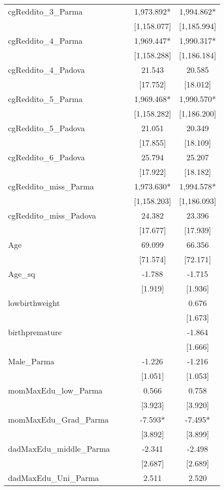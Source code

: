 \documentclass[]{article}
\begin{document}
\begin{tabular}{lcccc}
cgReddito\_3\_Parma &  &  & 1,973.892* & 1,994.862* \\
 &  &  & [1,158.077] & [1,185.994] \\
cgReddito\_4\_Parma &  &  & 1,969.447* & 1,990.317* \\
 &  &  & [1,158.288] & [1,186.184] \\
cgReddito\_4\_Padova &  &  & 21.543 & 20.585 \\
 &  &  & [17.752] & [18.012] \\
cgReddito\_5\_Parma &  &  & 1,969.468* & 1,990.570* \\
 &  &  & [1,158.282] & [1,186.200] \\
cgReddito\_5\_Padova &  &  & 21.051 & 20.349 \\
 &  &  & [17.855] & [18.109] \\
cgReddito\_6\_Padova &  &  & 25.794 & 25.207 \\
 &  &  & [17.922] & [18.182] \\
cgReddito\_miss\_Parma &  &  & 1,973.630* & 1,994.578* \\
 &  &  & [1,158.203] & [1,186.093] \\
cgReddito\_miss\_Padova &  &  & 24.382 & 23.396 \\
 &  &  & [17.677] & [17.939] \\
Age &  &  & 69.099 & 66.356 \\
 &  &  & [71.574] & [72.171] \\
Age\_sq &  &  & -1.788 & -1.715 \\
 &  &  & [1.919] & [1.936] \\
lowbirthweight &  &  &  & 0.676 \\
 &  &  &  & [1.673] \\
birthpremature &  &  &  & -1.864 \\
 &  &  &  & [1.666] \\
Male\_Parma &  &  & -1.226 & -1.216 \\
 &  &  & [1.051] & [1.053] \\
momMaxEdu\_low\_Parma &  &  & 0.566 & 0.758 \\
 &  &  & [3.923] & [3.920] \\
momMaxEdu\_Grad\_Parma &  &  & -7.593* & -7.495* \\
 &  &  & [3.892] & [3.899] \\
dadMaxEdu\_middle\_Parma &  &  & -2.341 & -2.498 \\
 &  &  & [2.687] & [2.689] \\
dadMaxEdu\_Uni\_Parma &  &  & 2.511 & 2.520 \\

\end{tabular}
\end{document}
